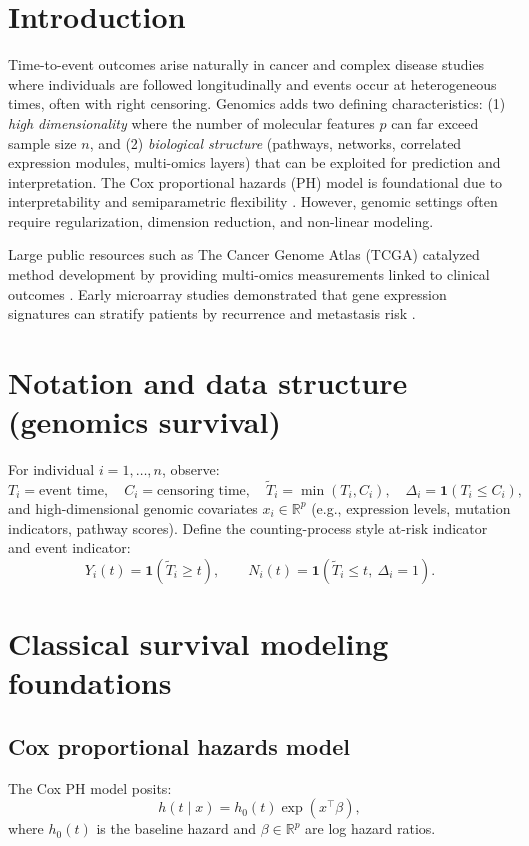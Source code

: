 \documentclass[11pt]{article}
\begin{document}
\section{Introduction}
Time-to-event outcomes arise naturally in cancer and complex disease studies where individuals are followed longitudinally and events occur at heterogeneous times, often with right censoring. Genomics adds two defining characteristics: (1) \emph{high dimensionality} where the number of molecular features $p$ can far exceed sample size $n$, and (2) \emph{biological structure} (pathways, networks, correlated expression modules, multi-omics layers) that can be exploited for prediction and interpretation.
The Cox proportional hazards (PH) model is foundational due to interpretability and semiparametric flexibility \citep{Cox1972}. However, genomic settings often require regularization, dimension reduction, and non-linear modeling.

Large public resources such as The Cancer Genome Atlas (TCGA) catalyzed method development by providing multi-omics measurements linked to clinical outcomes \citep{Weinstein2013,Tomczak2015,Liu2018}. Early microarray studies demonstrated that gene expression signatures can stratify patients by recurrence and metastasis risk \citep{VantVeer2002,Paik2004}.

\section{Notation and data structure (genomics survival)}\label{sec:notations}
For individual $i=1,\dots,n$, observe:
\[
T_i = \text{event time}, \quad C_i = \text{censoring time}, \quad
\tilde T_i = \min(T_i, C_i), \quad \Delta_i = \mathbf{1}(T_i \le C_i),
\]
and high-dimensional genomic covariates $x_i \in \mathbb{R}^p$ (e.g., expression levels, mutation indicators, pathway scores).
Define the counting-process style at-risk indicator and event indicator:
\[
Y_i(t) = \mathbf{1}(\tilde T_i \ge t), \qquad N_i(t) = \mathbf{1}(\tilde T_i \le t,\ \Delta_i=1).
\]

\section{Classical survival modeling foundations}\label{sec:classical-foundations}

\subsection{Cox proportional hazards model}
The Cox PH model posits:
\begin{equation}
h(t \mid x) = h_0(t)\exp(x^\top \beta),
\label{eq:cox_hazard}
\end{equation}
where $h_0(t)$ is the baseline hazard and $\beta \in \mathbb{R}^p$ are log hazard ratios.
\end{document}
